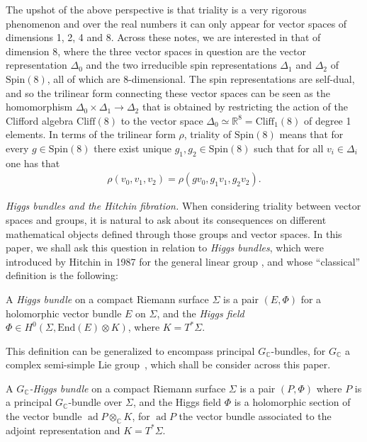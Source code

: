 \documentclass[10pt,a4paper]{amsart}
\numberwithin{equation}{section}
\begin{document}
The upshot of the above perspective is that triality is a very rigorous phenomenon and over the real numbers it can only appear for vector spaces of dimensions 1, 2, 4 and 8. Across these notes, we are interested in that of dimension 8, where the three vector spaces in question are the vector representation $\Delta_0$ and the two irreducible spin representations $\Delta_1$ and $\Delta_2$ of $\mathrm{Spin}(8)$, all of which are 8-dimensional. The spin representations are self-dual, and so the trilinear form connecting these vector spaces can be seen as the homomorphism $\Delta_0 \times \Delta_1 \to \Delta_2$ that is obtained by restricting the action of the Clifford algebra $\mathrm{Cliff}(8)$ to the vector space $\Delta_0 \simeq \mathbb{R}^8 = \mathrm{Cliff}_1(8)$ of degree 1 elements.
In terms of the trilinear form $\rho$, triality of $\mathrm{Spin}(8)$ means that for every $g \in \mathrm{Spin}(8)$ there exist unique $g_1, g_2 \in \mathrm{Spin}(8)$ such that for all $v_i \in \Delta_i$ one has that
\begin{eqnarray} \rho(v_0, v_1, v_2) = \rho (g v_0, g_1 v_1, g_2 v_2). \label{ecu11}
\end{eqnarray}

{\it Higgs bundles and the Hitchin fibration.} When considering triality between vector spaces and groups, it is natural to ask about its consequences on different mathematical objects defined through those groups and vector spaces. In this paper, we shall ask this question in relation to {\it Higgs bundles}, which were introduced by Hitchin in 1987 for the general linear group \cite{N1}, and whose ``classical'' definition is the following:

 \begin{Definition}\label{def:clasical}\label{clas}
 A {\em Higgs bundle} on a compact Riemann surface $\Sigma$ is a pair $(E,\Phi)$ for a holomorphic vector bundle $E$ on $\Sigma$, and the {\em Higgs field} $\Phi\in H^{0}(\Sigma,\text{End}(E)\otimes K)$, where $K=T^*\Sigma$.
 \end{Definition}

 This definition can be generalized to encompass principal $ G_\mathbb{C}$-bundles, for $ G_\mathbb{C}$ a complex semi-simple Lie group~\cite{N2}, which shall be consider across this paper.
 \begin{Definition}\label{principalLie}\label{defHiggs}\label{complex}
 A {\em $G_\mathbb{C}$-Higgs bundle} on a compact Riemann surface $\Sigma$ is a pair $(P,\Phi)$ where $P$ is a principal $ G_\mathbb{C}$-bundle over $\Sigma$, and the Higgs field $\Phi$ is a holomorphic section of the vector bundle $\operatorname{ad}P\otimes_{\mathbb{C}} K$, for $\operatorname{ad} P$ the vector bundle associated to the adjoint representation and $K=T^*\Sigma$.
 \end{Definition}
\end{document}
